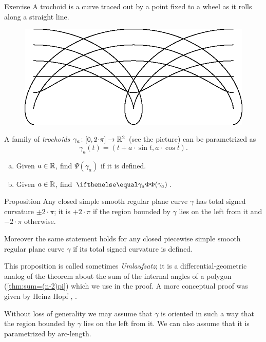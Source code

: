 \begin{thm}{Exercise}\label{ex:trochoids}
A trochoid is a curve traced out by a point fixed to a wheel as it rolls along a straight line.
\begin{figure}[h!]
\centering
\includegraphics{asy/trochoids}
\end{figure}
A family of \emph{trochoids} $\gamma_a\:[0,2\cdot\pi]\to \RR^2$ (see the picture) can be parametrized as
\[\gamma_a(t)=(t+a\cdot \sin t, a\cdot \cos t).\]
\begin{enumerate}[(a)]
\item Given $a\in \mathbb{R}$, find $\Psi(\gamma_a)$ if it is defined.
\item Given $a\in \mathbb{R}$, find $\tc{\gamma_a}$.
\end{enumerate}
\end{thm}

\begin{thm}{Proposition}\label{prop:total-signed-curvature}
Any closed simple smooth regular plane curve $\gamma$ has total signed curvature  $\pm2\cdot\pi$; it is $+2\cdot\pi$
if the region bounded by $\gamma$ lies on the left from it and  $-2\cdot\pi$ otherwise.

Moreover the same statement holds for any closed piecewise simple smooth regular plane curve $\gamma$ if its total signed curvature is defined.
\end{thm}

This proposition is called sometimes \emph{Umlaufsatz}; it is a differential-geometric analog of the theorem about the sum of the internal angles of a polygon (\ref{thm:sum=(n-2)pi}) which we use in the proof.
A more conceptual proof was given by Heinz Hopf \cite{hopf1935}, \cite[p. 42]{hopf1989}.

Without loss of generality we may assume that $\gamma$ is oriented in such a way that the region bounded by $\gamma$ lies on the left from it.
We can also assume that it is parametrized by arc-length.

